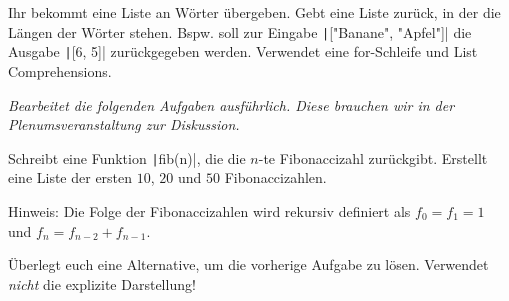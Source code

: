 \documentclass[a4paper, 12pt]{mksheetphhd}
\begin{document}
	\begin{aufgabe}
		Ihr bekommt eine Liste an Wörter übergeben. Gebt eine Liste zurück, in der die Längen der Wörter stehen. Bspw. soll zur Eingabe \texttt|["Banane", "Apfel"]| die Ausgabe \texttt|[6, 5]| zurückgegeben werden. Verwendet eine for-Schleife und List Comprehensions.
	\end{aufgabe}
	
	\textit{Bearbeitet die folgenden Aufgaben ausführlich. Diese brauchen wir in der Plenumsveranstaltung zur Diskussion.}
	
	\begin{aufgabe}
		Schreibt eine Funktion \texttt|fib(n)|, die die $n$-te Fibonaccizahl zurückgibt. Erstellt eine Liste der ersten $10$, $20$ und $50$ Fibonaccizahlen.
		
		\small Hinweis: Die Folge der Fibonaccizahlen wird rekursiv definiert als $f_0 = f_1 = 1$ und $f_n = f_{n-2} + f_{n-1}$. 
	\end{aufgabe}
	
	\begin{aufgabe}
		Überlegt euch eine Alternative, um die vorherige Aufgabe zu lösen. Verwendet \textit{nicht} die explizite Darstellung!
	\end{aufgabe}
	
	\printlicense
	
	\printsocials
	
\end{document}
